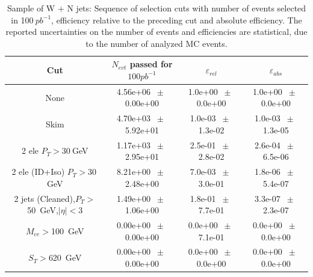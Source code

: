 \begin{table}[htbp]
\begin{center}
\begin{tabular}{|c|c|c|c|}
\hline\hline
 Cut & $N_{evt}$ passed for $100pb^{-1}$ & $\varepsilon_{rel}$ & $\varepsilon_{abs}$ \\
\hline\hline
None       &        4.56e+06       $~\pm~$       0.00e+00        &        1.0e+00       $~\pm~$       0.0e+00        &        1.0e+00       $~\pm~$       0.0e+00       \\       
       Skim       &        4.70e+03       $~\pm~$       5.92e+01        &        1.0e-03       $~\pm~$       1.3e-02        &        1.0e-03       $~\pm~$       1.3e-05       \\       
       2 ele $P_T>30~$GeV       &        1.17e+03       $~\pm~$       2.95e+01        &        2.5e-01       $~\pm~$       2.8e-02        &        2.6e-04       $~\pm~$       6.5e-06       \\       
       2 ele (ID+Iso) $P_T>30~$GeV       &        8.21e+00       $~\pm~$       2.48e+00        &        7.0e-03       $~\pm~$       3.0e-01        &        1.8e-06       $~\pm~$       5.4e-07       \\       
       2 jets (Cleaned),$P_T>$50~GeV,$|\eta|<$3       &        1.49e+00       $~\pm~$       1.06e+00        &        1.8e-01       $~\pm~$       7.7e-01        &        3.3e-07       $~\pm~$       2.3e-07       \\       
       $M_{ee}>$100~GeV       &        0.00e+00       $~\pm~$       0.00e+00        &        0.0e+00       $~\pm~$       7.1e-01        &        0.0e+00       $~\pm~$       0.0e+00       \\       
       $S_T>$620~GeV       &        0.00e+00       $~\pm~$       0.00e+00        &        0.0e+00       $~\pm~$       0.0e+00        &        0.0e+00       $~\pm~$       0.0e+00       \\       
          \hline\hline
\end{tabular}
\end{center}
\caption{Sample of W + N jets: Sequence of selection cuts with number of events selected in 100$~pb^{-1}$, efficiency relative to the preceding cut and absolute efficiency.  The reported uncertainties on the number of events and efficiencies are statistical, due to the number of analyzed MC events.}
\label{tab:effic-W}
\end{table}

